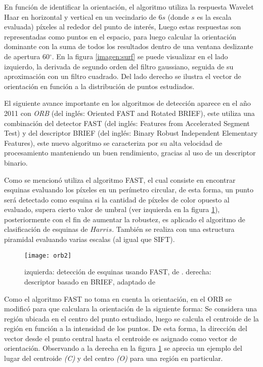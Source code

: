 En función de identificar la orientación, el algoritmo utiliza la respuesta Wavelet Haar en horizontal y vertical en un vecindario de 6$s$ (donde $s$ es la escala evaluada) píxeles al rededor del punto de interés, Luego estas respuestas son representadas como puntos en el espacio, para luego calcular la orientación dominante con la suma de todos los resultados dentro de una ventana deslizante de apertura 60$^\circ$. En la figura \ref{imagen:surf} se puede visualizar en el lado izquierdo, la derivada de segundo orden del filtro gaussiano, seguida de su aproximación con un filtro cuadrado. Del lado derecho se ilustra el vector de orientación en función a la distribución de puntos estudiados.

El siguiente avance importante en los algoritmos de detección aparece en el año 2011 con \textit{ORB} \cite{orb} (del inglés: Oriented FAST and Rotated BRIEF), este utiliza una combinación del detector FAST (del inglés: Features from Accelerated Segment Test) y del descriptor BRIEF (del inglés: Binary Robust Independent Elementary Features), este nuevo algoritmo se caracteriza por su alta velocidad de procesamiento manteniendo un buen rendimiento, gracias al uso de un descriptor binario. 

Como se mencionó utiliza el algoritmo FAST, el cual consiste en encontrar esquinas evaluando los píxeles en un perímetro circular, de esta forma, un punto será detectado como esquina si la cantidad de píxeles de color opuesto al evaluado, supera cierto valor de umbral (ver izquierda en la figura \ref{imagen:orb}), posteriormente con el fin de aumentar la robustez, es aplicado el algoritmo de clasificación de esquinas de $Harris$. También se realiza con una estructura piramidal evaluando varias escalas (al igual que SIFT).

\begin{figure}[H]
	\centering
	\texttt{[image: orb2]}
	\caption[Detector y descriptor ORB]{izquierda: detección de esquinas usando FAST, de \cite{fast}. derecha: descriptor basado en BRIEF, adaptado de\protect\footnotemark }
	\label{imagen:orb}
\end{figure}

Como el algoritmo FAST no toma en cuenta la orientación, en el ORB se modificó para que calculara la orientación de la siguiente forma: Se considera una región ubicada en el centro del punto estudiado, luego se calcula el centroide de la región en función a la intensidad de los puntos. De esta forma, la dirección del vector desde el punto central  hasta el centroide es asignado como vector de orientación. Observando a la derecha en la figura \ref{imagen:orb} se aprecia un ejemplo del lugar del centroide \textit{(C)} y del centro \textit{(O)} para una región en particular.

